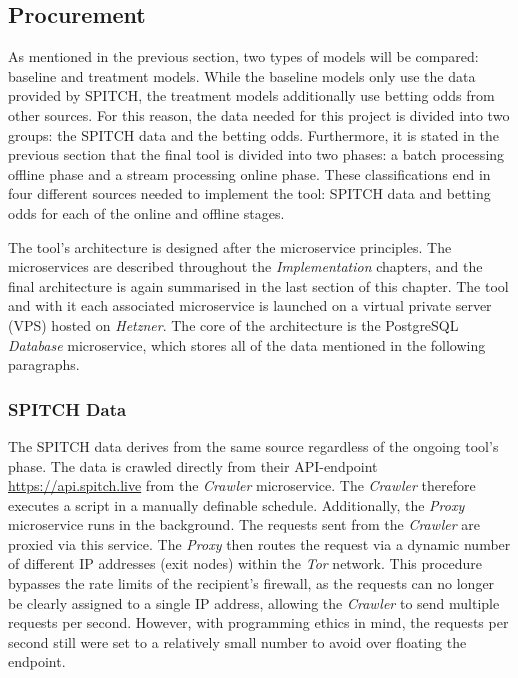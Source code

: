 \subsection{Procurement}

As mentioned in the previous section, two types of models will be compared: baseline and treatment models. While the baseline models only use the data provided by SPITCH, the treatment models additionally use betting odds from other sources. For this reason, the data needed for this project is divided into two groups: the SPITCH data and the betting odds. Furthermore, it is stated in the previous section that the final tool is divided into two phases: a batch processing offline phase and a stream processing online phase. These classifications end in four different sources needed to implement the tool: SPITCH data and betting odds for each of the online and offline stages.

The tool's architecture is designed after the microservice principles. The microservices are described throughout the \emph{Implementation} chapters, and the final architecture is again summarised in the last section of this chapter. The tool and with it each associated microservice is launched on a virtual private server (VPS) hosted on \emph{Hetzner}. \parencite[see][]{hetzner_about_2021} The core of the architecture is the PostgreSQL \emph{Database} microservice, which stores all of the data mentioned in the following paragraphs.

\subsubsection{SPITCH Data}

The SPITCH data derives from the same source regardless of the ongoing tool's phase. The data is crawled directly from their API-endpoint \underline{https://api.spitch.live} from the \emph{Crawler} microservice. The \emph{Crawler} therefore executes a script in a manually definable schedule. Additionally, the \emph{Proxy} microservice runs in the background. The requests sent from the \emph{Crawler} are proxied via this service. The \emph{Proxy} then routes the request via a dynamic number of different IP addresses (exit nodes) within the \emph{Tor} network. This procedure bypasses the rate limits of the recipient's firewall, as the requests can no longer be clearly assigned to a single IP address, allowing the \emph{Crawler} to send multiple requests per second. However, with programming ethics in mind, the requests per second still were set to a relatively small number to avoid over floating the endpoint.


